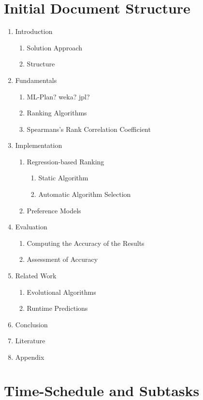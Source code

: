 \documentclass[12pt]{scrartcl}
\begin{document}
\section{Initial Document Structure}\label{sec:doc-structure}
\begin{enumerate}
	\item Introduction
	\begin{enumerate}[1.1]
		\item Solution Approach
		\item Structure
	\end{enumerate}
	\item Fundamentals
	\begin{enumerate}[2.1]
		\item ML-Plan? weka? jpl?
		\item Ranking Algorithms
		\item Spearmans's Rank Correlation Coefficient
	\end{enumerate}
	\item Implementation
	\begin{enumerate} [3.1]
		\item Regression-based Ranking
		\begin{enumerate}[3.1.1]
			\item Static Algorithm
			\item Automatic Algorithm Selection
		\end{enumerate}
		\item Preference Models
	\end{enumerate}
	\item Evaluation
	\begin{enumerate}[4.1]
		\item Computing the Accuracy of the Results
		\item Assessment of Accuracy
	\end{enumerate}
	\item Related Work
	\begin{enumerate}[5.1]
		\item Evolutional Algorithms
		\item Runtime Predictions
	\end{enumerate}
	\item Conclusion
	\item Literature
	\item Appendix
\end{enumerate}

\newpage

\section{Time-Schedule and Subtasks}\label{sec:schedule-and-subtasks}
\end{document}
